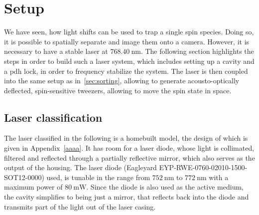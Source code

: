 \begin{figure}[t]%
\end{figure}

\section{Setup}

We have seen, how light shifts can be used to trap a single spin species. Doing so, it is possible to spatially separate and image them onto a camera. However, it is necessary to have a stable laser at $\SI{768.40}{\nano\meter}$. The following section highlights the steps in order to build such a laser system, which includes setting up a cavity and a \ac{pdh} lock, in order to frequency stabilize the system. The laser is then coupled into the same setup as in~\ref{sec:sorting}, allowing to generate acousto-optically deflected, spin-sensitive tweezers, allowing to move the spin state in space.

\subsection{Laser classification}

The laser classified in the following is a homebuilt model, the design of which is given in Appendix~\ref{aaaa}. It has room for a laser diode, whose light is collimated, filtered and reflected through a partially reflective mirror, which also serves as the output of the housing.
The laser diode (Eagleyard EYP-RWE-0760-02010-1500-SOT12-0000) used, is tunable in the range from $\SI{752}{\nano\meter}$ to $\SI{772}{\nano\meter}$ with a maximum power of $\SI{80}{\milli\watt}$. Since the diode is also used as the active medium, the cavity simplifies to being just a mirror, that reflects back into the diode and transmits part of the light out of the laser casing.

